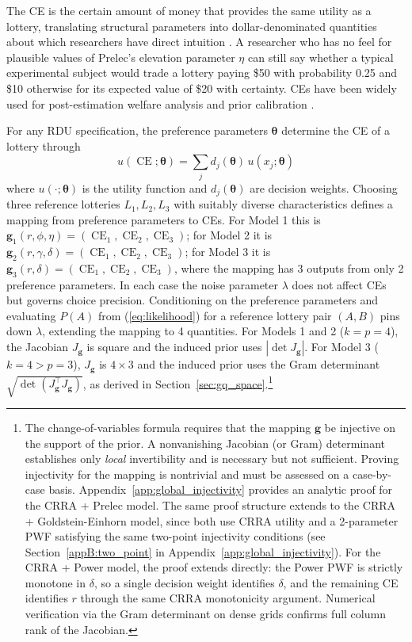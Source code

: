 \documentclass[12pt,a4paper]{article}
\theoremstyle{definition}
\theoremstyle{remark}
\DeclareMathOperator{\CE}{CE}
\newcommand{\bth}{\boldsymbol{\theta}}
\newcommand{\bg}{\mathbf{g}}
\begin{document}
The CE is the certain amount of money that provides the same utility as a
lottery, translating structural parameters into dollar-denominated quantities
about which researchers have direct intuition
\parencite{Abdellaoui2000}. A researcher who has no feel for plausible values
of Prelec's elevation parameter $\eta$ can still say whether a typical
experimental subject would trade a lottery paying \$50 with probability 0.25
and \$10 otherwise for its expected value of \$20 with certainty. CEs have been widely used for post-estimation
welfare analysis \parencite{Harrison2016, Gao2022, Monroe2023} and prior
calibration \parencite{Bland2025}.

For any RDU specification, the preference parameters $\bth$ determine the CE
of a lottery through
\begin{equation}
  \label{eq:ce_definition}
  u(\CE; \bth) = \sum_j d_j(\bth) \,
  u(x_j; \bth)
\end{equation}
where $u(\cdot; \bth)$ is the utility function and $d_j(\bth)$ are decision
weights. Choosing three reference lotteries $L_1, L_2, L_3$ with suitably
diverse characteristics defines a mapping from preference parameters to CEs.
For Model 1 this is $\bg_1(r, \phi, \eta) = (\CE_1, \CE_2, \CE_3)$; for
Model 2 it is $\bg_2(r, \gamma, \delta) = (\CE_1, \CE_2, \CE_3)$; for
Model 3 it is $\bg_3(r, \delta) = (\CE_1, \CE_2, \CE_3)$, where the mapping
has 3 outputs from only 2 preference parameters. In each case the noise
parameter $\lambda$ does not affect CEs but governs choice precision.
Conditioning on the preference parameters and evaluating $P(A)$ from
(\ref{eq:likelihood}) for a reference lottery pair $(A, B)$ pins down
$\lambda$, extending the mapping to 4 quantities. For Models 1 and 2 ($k =
p = 4$), the Jacobian $J_\bg$ is square and the induced prior uses $|\det
J_\bg|$. For Model 3 ($k = 4 > p = 3$), $J_\bg$ is $4 \times 3$ and the
induced prior uses the Gram determinant $\sqrt{\det(J_\bg^\top J_\bg)}$, as
derived in Section~\ref{sec:gq_space}.\footnote{
  The change-of-variables formula requires that the mapping $\bg$ be
  injective on the support of the prior. A nonvanishing Jacobian (or Gram)
  determinant establishes only \textit{local} invertibility and is necessary
  but not sufficient. Proving injectivity for the mapping is nontrivial and
  must be assessed on a case-by-case basis.
  Appendix~\ref{app:global_injectivity} provides an analytic proof for the
  CRRA + Prelec model. The same proof structure extends to the
  CRRA + Goldstein-Einhorn model, since both use CRRA utility and a
  2-parameter PWF satisfying the same two-point injectivity conditions
  (see Section~\ref{appB:two_point} in Appendix~\ref{app:global_injectivity}).
  For the CRRA + Power model, the proof extends directly: the Power PWF is
  strictly monotone in $\delta$, so a single decision weight identifies
  $\delta$, and the remaining CE identifies $r$ through the same CRRA
  monotonicity argument. Numerical verification via the Gram determinant
  on dense grids confirms full column rank of the Jacobian.
}
\end{document}
